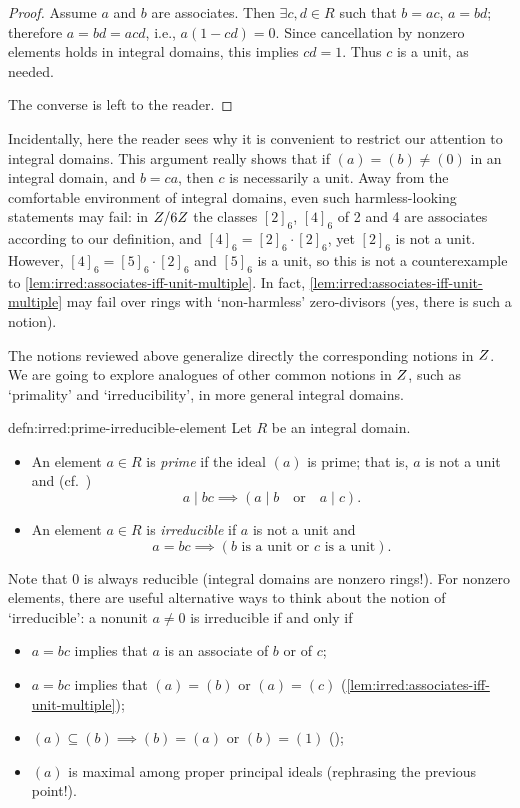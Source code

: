 \begin{proof}
  Assume $a$ and $b$ are associates. Then $\exists c, d \in R$ such
  that $b = ac$, $a = bd$; therefore $a = bd = acd$, i.e.,
  $a(1 - cd) = 0$.  Since cancellation by nonzero elements holds in
  integral domains, this implies $cd = 1$. Thus $c$ is a unit, as
  needed.

  The converse is left to the reader.
\end{proof}
Incidentally, here the reader sees why it is convenient to restrict
our attention to integral domains. This argument really shows that if
$(a) = (b) \neq (0)$ in an integral domain, and $b = ca$, then $c$ is
necessarily a unit. Away from the comfortable environment of integral
domains, even such harmless-looking statements may fail: in $Z/6Z$
the classes $[2]_6$, $[4]_6$ of 2 and 4 are associates according to
our definition, and $[4]_6 = [2]_6 \cdot [2]_6$, yet $[2]_6$ is not a
unit.  However, $[4]_6 = [5]_6 \cdot [2]_6$ and $[5]_6$ is a unit, so
this is not a counterexample to \cref{lem:irred:associates-iff-unit-multiple}. In fact,
\cref{lem:irred:associates-iff-unit-multiple} may fail over rings with `non-harmless'
zero-divisors (yes, there is such a notion).

The notions reviewed above generalize directly the corresponding
notions in $Z$. We are going to explore analogues of other common
notions in $Z$, such as `primality' and `irreducibility', in more
general integral domains.
\begin{defn}{}{defn:irred:prime-irreducible-element}
  Let $R$ be an integral domain.
  \begin{itemize}
  \item An element $a \in R$ is \emph{prime} if the ideal $(a)$ is
    prime; that is, $a$ is not a unit and (cf.\
    )
    \[a \mid bc \implies (a \mid b \quad\text{or}\quad a \mid c).\]
  \item An element $a \in R$ is \emph{irreducible} if $a$ is not a
    unit and
    \[a = bc \implies (b \text{ is a unit or } c \text{ is a unit}).\]
  \end{itemize}
\end{defn}

Note that $0$ is always reducible (integral domains are nonzero
rings!).  For nonzero elements, there are useful alternative ways to
think about the notion of `irreducible': a nonunit $a \neq 0$ is
irreducible if and only if
\begin{itemize}
\item $a = bc$ implies that $a$ is an associate of $b$ or of $c$;
\item $a = bc$ implies that $(a) = (b)$ or $(a) = (c)$
  (\cref{lem:irred:associates-iff-unit-multiple});
\item $(a) \subseteq (b) \implies (b) = (a)$ or $(b) = (1)$
  ();
\item $(a)$ is maximal among proper principal ideals (rephrasing the
  previous point!).
\end{itemize}

